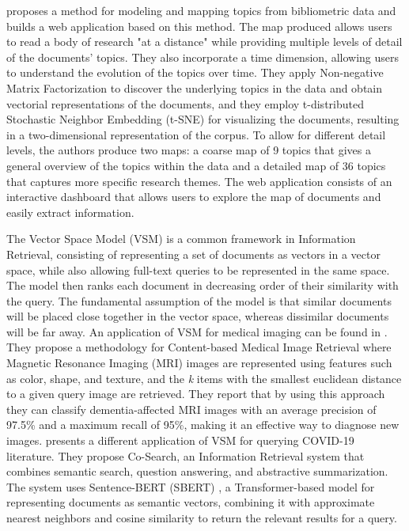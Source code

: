\documentclass[a4paper]{article}
\begin{document}
\citep{lafia2021a} proposes a method for modeling and mapping topics from bibliometric data and builds a web application based on this method. The map produced allows users to read a body of research "at a distance" while providing multiple levels of detail of the documents' topics. They also incorporate a time dimension, allowing users to understand the evolution of the topics over time. They apply Non-negative Matrix Factorization \citep{lee1999} to discover the underlying topics in the data and obtain vectorial representations of the documents, and they employ t-distributed Stochastic Neighbor Embedding (t-SNE) \citep{vandermaaten2008} for visualizing the documents, resulting in a two-dimensional representation of the corpus. To allow for different detail levels, the authors produce two maps: a coarse map of 9 topics that gives a general overview of the topics within the data and a detailed map of 36 topics that captures more specific research themes. The web application consists of an interactive dashboard that allows users to explore the map of documents and easily extract information.

The Vector Space Model (VSM) \citep[p.~120-126]{schutze2008} is a common framework in Information Retrieval, consisting of representing a set of documents as vectors in a vector space, while also allowing full-text queries to be represented in the same space. The model then ranks each document in decreasing order of their similarity with the query. The fundamental assumption of the model is that similar documents will be placed close together in the vector space, whereas dissimilar documents will be far away. An application of VSM for medical imaging can be found in \citep{sampathila2020}. They propose a methodology for Content-based Medical Image Retrieval where Magnetic Resonance Imaging (MRI) images are represented using features such as color, shape, and texture, and the \emph{k} items with the smallest euclidean distance to a given query image are retrieved. They report that by using this approach they can classify dementia-affected MRI images with an average precision of 97.5\% and a maximum recall of 95\%, making it an effective way to diagnose new images. \citep{esteva2020} presents a different application of VSM for querying COVID-19 literature. They propose Co-Search, an Information Retrieval system that combines semantic search, question answering, and abstractive summarization. The system uses Sentence-BERT (SBERT) \citep{reimers2019}, a Transformer-based model for representing documents as semantic vectors, combining it with approximate nearest neighbors and cosine similarity to return the relevant results for a query.
\end{document}
